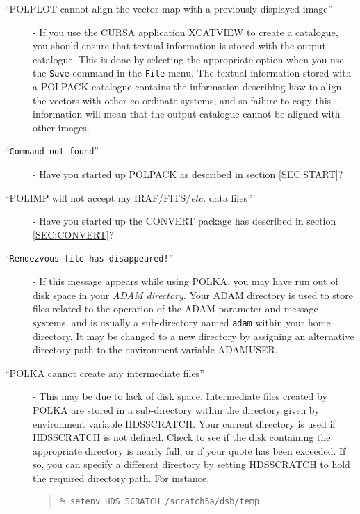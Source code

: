 \documentclass[twoside,11pt]{article}
\newcommand{\hyperref}[4]{#2\ref{#4}#3}
\newcommand{\htmlref}[2]{#1}
\newcommand{\xref}[3]{#1}
\renewcommand{\_}{\texttt{\symbol{95}}}
\newenvironment{myquote}{\begin{quote}\begin{small}}{\end{small}\end{quote}}
\begin{document}
\begin{description}

\item [``POLPLOT cannot align the vector map with a previously displayed
image''] - If you use the CURSA application \xref{XCATVIEW}{sun190}{XVIEW} 
to create a catalogue, you should ensure that textual information is
stored with the output catalogue. This is done by selecting the
appropriate option when you use the \texttt{Save} command  in the
\texttt{File} menu. The textual information stored with a POLPACK
catalogue contains the information describing how to align the vectors with
other co-ordinate systems, and so failure to copy this information will
mean that the output catalogue cannot be aligned with other images.

\item [``\texttt{Command not found}''] - Have you started up POLPACK
as described \hyperref{here}{in section }{}{SEC:START}?

\item [``POLIMP will not accept my IRAF/FITS/\emph{etc.} data files''] - Have
you started up the CONVERT package has described \hyperref{here}{in section }
{}{SEC:CONVERT}?

\item [``\texttt{Rendezvous file has disappeared!}''] - If this message
appears while using \htmlref{POLKA}{POLKA}, you may have run out of disk
space in your \emph{ADAM directory}. Your ADAM directory is used to store
files related to the operation of the ADAM parameter and message systems,
and is usually a sub-directory named \texttt{adam} within your home
directory. It may be changed to a new directory by assigning an
alternative directory path to the environment variable ADAM\_USER.

\item [``POLKA cannot create any intermediate files''] - This may be due
to lack of disk space. Intermediate files created by POLKA are stored
in a sub-directory within the directory given by environment variable
HDS\_SCRATCH. Your current directory is used if HDS\_SCRATCH is not
defined. Check to see if the disk containing the appropriate directory is
nearly full, or if your quote has been exceeded. If so, you can specify a
different directory by setting HDS\_SCRATCH to hold the required directory
path. For instance,

\begin{myquote}
\begin{verbatim}
% setenv HDS_SCRATCH /scratch5a/dsb/temp
\end{verbatim}
\end{myquote}


\end{description}
\end{document}
